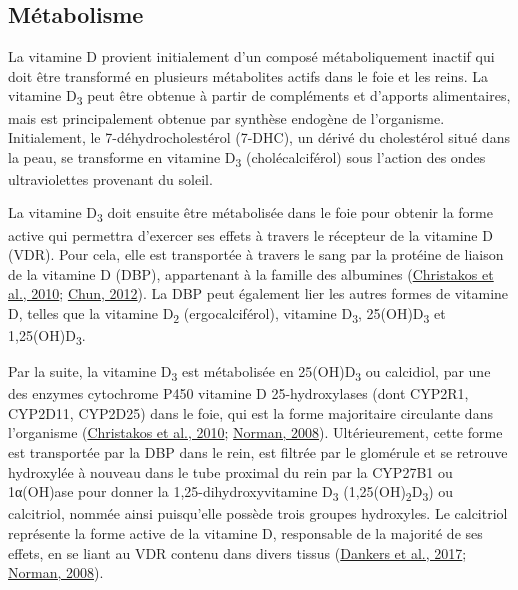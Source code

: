 \documentclass[
  letterpaper,
  DIV=11,
  numbers=noendperiod]{scrartcl}
\begin{document}
\hypertarget{muxe9tabolisme}{%
\subsection{Métabolisme}\label{muxe9tabolisme}}

La vitamine D provient initialement d'un composé métaboliquement inactif
qui doit être transformé en plusieurs métabolites actifs dans le foie et
les reins. La vitamine D\textsubscript{3} peut être obtenue à partir de
compléments et d'apports alimentaires, mais est principalement obtenue
par synthèse endogène de l'organisme. Initialement, le
7-déhydrocholestérol (7-DHC), un dérivé du cholestérol situé dans la
peau, se transforme en vitamine D\textsubscript{3} (cholécalciférol)
sous l'action des ondes ultraviolettes provenant du soleil.

La vitamine D\textsubscript{3} doit ensuite être métabolisée dans le
foie pour obtenir la forme active qui permettra d'exercer ses effets à
travers le récepteur de la vitamine D (VDR). Pour cela, elle est
transportée à travers le sang par la protéine de liaison de la vitamine
D (DBP), appartenant à la famille des albumines
(\protect\hyperlink{ref-Christakos.2010}{Christakos et al., 2010};
\protect\hyperlink{ref-Chun.2012}{Chun, 2012}). La DBP peut également
lier les autres formes de vitamine D, telles que la vitamine
D\textsubscript{2} (ergocalciférol), vitamine D\textsubscript{3},
25(OH)D\textsubscript{3} et 1,25(OH)D\textsubscript{3}.

Par la suite, la vitamine D\textsubscript{3} est métabolisée en
25(OH)D\textsubscript{3} ou calcidiol, par une des enzymes cytochrome
P450 vitamine D 25-hydroxylases (dont CYP2R1, CYP2D11, CYP2D25) dans le
foie, qui est la forme majoritaire circulante dans l'organisme
(\protect\hyperlink{ref-Christakos.2010}{Christakos et al., 2010};
\protect\hyperlink{ref-Norman.2008}{Norman, 2008}). Ultérieurement,
cette forme est transportée par la DBP dans le rein, est filtrée par le
glomérule et se retrouve hydroxylée à nouveau dans le tube proximal du
rein par la CYP27B1 ou 1α(OH)ase pour donner la 1,25-dihydroxyvitamine
D\textsubscript{3} (1,25(OH)\textsubscript{2}D\textsubscript{3}) ou
calcitriol, nommée ainsi puisqu'elle possède trois groupes hydroxyles.
Le calcitriol représente la forme active de la vitamine D, responsable
de la majorité de ses effets, en se liant au VDR contenu dans divers
tissus (\protect\hyperlink{ref-Dankers.2017}{Dankers et al., 2017};
\protect\hyperlink{ref-Norman.2008}{Norman, 2008}).
\end{document}

